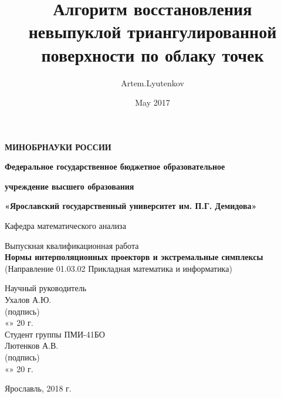 \documentclass[12pt]{article} %
\title{Алгоритм восстановления невыпуклой триангулированной поверхности по облаку точек}
\author{Artem.Lyutenkov }
\date{May 2017}
\begin{document}
	
	\begin{titlepage} 
		\begin{center}
			\large
			\textbf{МИНОБРНАУКИ РОССИИ}
			
			
			\vspace{0.5cm}
			
			\textbf{Федеральное государственное бюджетное образовательное}
			
			\textbf{учреждение высшего образования}
			
			\textbf{«Ярославский государственный университет им. П.Г. Демидова»}
			\vspace{0.25cm}
			
			
			Кафедра математического анализа
			\vfill
			
			Выпускная квалификационная работа \\
			\textbf{Нормы интерполяционных проекторв и экстремальные симплексы } \\
			(Направление 01.03.02 Прикладная математика и информатика) 
			\vfill
			
			
			\bigskip
			
			
		\end{center}
		
		\begin{flushright}
			Научный руководитель\\
			Ухалов А.Ю. \hspace{0.1cm}  \underline{\hspace{2cm}}\\
			\small(подпись)\\
			«\underline{\hspace{0.5cm}}» \underline{\hspace{1.5cm}} 20 \underline{\hspace{0.2cm}} г.\\
			Студент группы ПМИ-41БО\\
			Лютенков А.В. \hspace{0.1cm}  \underline{\hspace{2cm}}\\
			\small(подпись)\\
			«\underline{\hspace{0.5cm}}» \underline{\hspace{1.5cm}} 20 \underline{\hspace{0.2cm}} г.\\
		\end{flushright}
		\begin{center}
			Ярославль, 2018 г.
		\end{center}
	\end{titlepage}
	\tableofcontents \thispagestyle{empty}
	\newpage
	\setcounter{page}{3}
	
\end{document}
